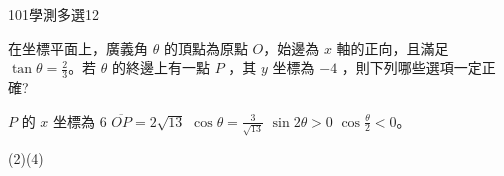     \begin{QUESTION}
        \begin{ExamInfo}{101}{學測}{多選}{12}
        \end{ExamInfo}
        \begin{ExamAnsRateInfo}{42}{64}{40}{22}
        \end{ExamAnsRateInfo}
        \begin{QBODY}
            在坐標平面上，廣義角 $\theta$ 的頂點為原點 $O$，始邊為 $x$ 軸的正向，且滿足 $\tan \theta =\frac{2}{3}$。若 $\theta$ 的終邊上有一點 $P$ ，其 $y$ 坐標為 $-4$ ，則下列哪些選項一定正確? 
			\begin{QOPS} 
				\QOP $P$ 的 $x$ 坐標為 6 
				\QOP $\overline{OP} = 2\sqrt{13}$ 
				\QOP $\cos\theta = \frac{3}{\sqrt{13}}$ 
				\QOP $\sin 2\theta >0$ 
				\QOP $\cos \frac{\theta}{2} <0$。
			\end{QOPS}
        \end{QBODY}
        \begin{QFROMS}
        \end{QFROMS}
        \begin{QTAGS}\end{QTAGS}
        \begin{QANS}
            (2)(4)
        \end{QANS}
        \begin{QSOLLIST}
        \end{QSOLLIST}
        \begin{QEMPTYSPACE}
        \end{QEMPTYSPACE}
    \end{QUESTION}
